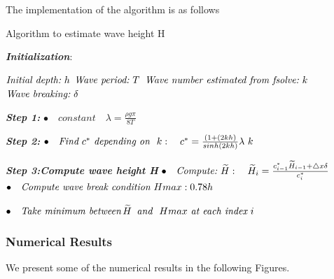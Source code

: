 The implementation of the algorithm is as follows
\begin{algorithm}
\caption{Algorithm to estimate wave height H}\label{euclid}
\begin{algorithmic}[1]
\Procedure{}{}
\BState \emph{\textit{\textbf{Initialization}}}:

\State $\textit{Initial depth:\,\,} h$
\State $\textit{Wave period:\,\,} T$
\State $\textit{Wave number estimated from fsolve:\,\,}k$
\State $\textit{Wave breaking:\,\,}\delta$

\BState \emph{\textbf{Step 1:}}
\State $\bullet \quad\textit{constant}\quad \lambda=\frac{ \rho g \pi}{8T}$

\BState \emph{\textbf{Step 2:}}
\State $\bullet \quad\textit{Find\,\,} c^{*} \textit{\,\,depending on \,\,}k:\quad c^{*}=\frac{(1+(2kh)}{sinh(2kh)}\lambda \,\, k$

\BState \emph{\textbf{Step 3:Compute wave height H}}
\State $\bullet \quad\textit{Compute:\,\,}\widetilde{H}:\quad \widetilde{H}_{i}=\frac{c_{i-1}^{*}\widetilde{H}_{i-1}+\triangle x \delta}{c_{i}^{*}}$
\State $\bullet \quad\textit{Compute wave break condition\,\,}Hmax:0.78 h$

\State $\bullet \quad\textit{Take minimum between\,}\widetilde{H} \textit{\, and \,\,} Hmax \textit{\,\,at each index\,\,}i\quad $

\EndProcedure
\end{algorithmic}
\end{algorithm} 


\subsubsection{Numerical Results}
We present some of the numerical results in the following Figures.



